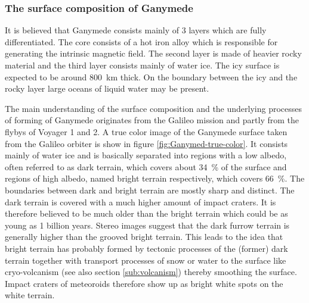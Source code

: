 \subsubsection{The surface composition of Ganymede}

It is believed that Ganymede consists mainly of 3 layers which are
fully differentiated. The core consists of a hot iron alloy which
is responsible for generating the intrinsic magnetic field. The second
layer is made of heavier rocky material and the third layer consists
mainly of water ice. The icy surface is expected to be around 800~km
thick. On the boundary between the icy and the rocky layer large oceans
of liquid water may be present\cite{bagenal2007jupiter}.

The main understanding of the surface composition and the underlying
processes of forming of Ganymede originates from the Galileo mission
and partly from the flybys of Voyager 1 and 2. A true color image
of the Ganymede surface taken from the Galileo orbiter is show in
figure \ref{fig:Ganymed-true-color}. It consists mainly of water
ice and is basically separated into regions with a low albedo, often
referred to as dark terrain, which covers about 34~\% of the surface
and regions of high albedo, named bright terrain respectively, which
covers 66~\%\cite{bagenal2007jupiter}. The boundaries between dark
and bright terrain are mostly sharp and distinct. The dark terrain
is covered with a much higher amount of impact craters. It is therefore
believed to be much older than the bright terrain which could be as
young as 1 billion years\cite{Showman2004}. Stereo images suggest
that the dark furrow terrain is generally higher than the grooved
bright terrain. This leads to the idea that bright terrain has probably
formed by tectonic processes of the (former) dark terrain together
with transport processes of snow or water to the surface like cryo-volcanism
(see also section \ref{sub:volcanism}) thereby smoothing the surface.
Impact craters of meteoroids therefore show up as bright white spots
on the white terrain\cite{bagenal2007jupiter,Patterson2010,Schenk2001,Showman1997,Showman2004}. 

